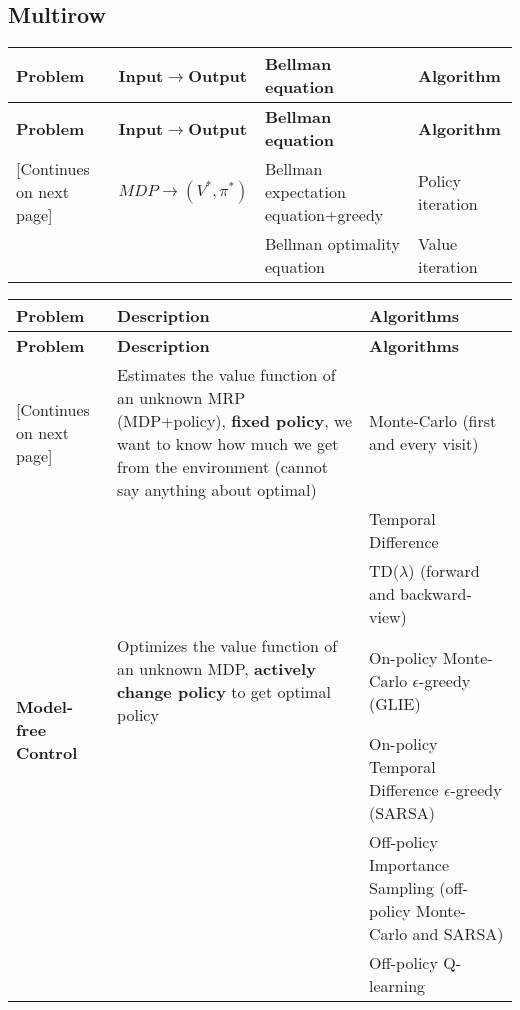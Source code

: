 \subsection{Multirow}
\begin{tabularx}{\linewidth}{X X X X}
    \toprule
    \textbf{Problem} & \textbf{Input$\rightarrow$Output} & \textbf{Bellman equation} & \textbf{Algorithm}\\
    \midrule
    \endfirsthead
    \toprule
    \textbf{Problem} & \textbf{Input$\rightarrow$Output} & \textbf{Bellman equation} & \textbf{Algorithm}\\
    \midrule
    \endhead
    \midrule
    \footnotesize [Continues on next page]
    \endfoot
    \bottomrule
    \endlastfoot
    \multirow{2}{*}{\textbf{Control}}   & $MDP\rightarrow\left(V^*,\pi^*\right)$ & Bellman expectation equation+greedy & Policy iteration \\ \cmidrule{3-4}
                                        & & Bellman optimality equation & Value iteration
\end{tabularx}

\begin{tabularx}{\linewidth}{X X X}
    \toprule
    \textbf{Problem} & \textbf{Description} & \textbf{Algorithms}\\
    \midrule
    \endfirsthead
    \toprule
    \textbf{Problem} & \textbf{Description} & \textbf{Algorithms}\\
    \midrule
    \endhead
    \midrule
    \footnotesize [Continues on next page]
    \endfoot
    \bottomrule
    \endlastfoot
    \multirow{3}{*}{\textbf{Model-free Prediction}} & Estimates the value function of an unknown MRP (MDP+policy), \textbf{fixed policy}, we want to know how much we get from the environment (cannot say anything about optimal)& Monte-Carlo (first and every visit) \\ \cmidrule{3-3}
    & & Temporal Difference \\ \cmidrule{3-3}
    & & TD($\lambda$) (forward and backward-view)\\ \midrule
    \multirow{2}{*}{\textbf{Model-free Control}} & Optimizes the value function of an unknown MDP, \textbf{actively change policy} to get optimal policy & On-policy Monte-Carlo $\epsilon$-greedy (GLIE) \\ \cmidrule{3-3}
    & & On-policy Temporal Difference $\epsilon$-greedy (SARSA) \\ \cmidrule{3-3}
    & & Off-policy Importance Sampling (off-policy Monte-Carlo and SARSA) \\ \cmidrule{3-3}
    & & Off-policy Q-learning
\end{tabularx}

